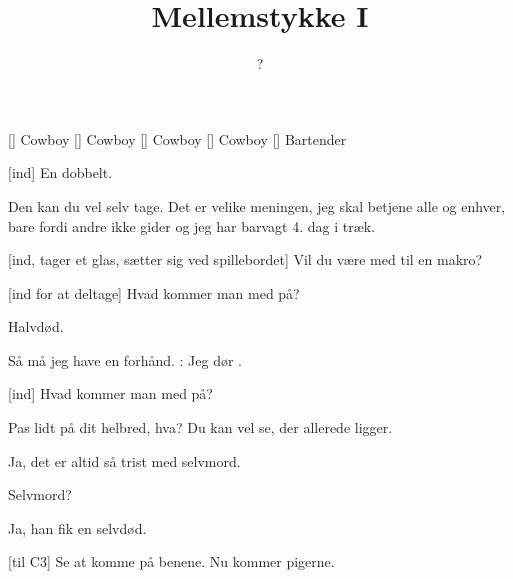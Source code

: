 \documentclass[a4paper,11pt]{article}
\title{Mellemstykke I}
\author{?}
\begin{document}
\maketitle

\begin{roles}
[] Cowboy
[] Cowboy
[] Cowboy
[] Cowboy
[] Bartender
\end{roles}

\begin{sketch}

[ind] En dobbelt.

 Den kan du vel selv tage.  Det er velike meningen, jeg skal
betjene alle og enhver, bare fordi andre ikke gider og jeg har barvagt
4. dag i træk.

[ind, tager et glas, sætter sig ved spillebordet] Vil du være
med til en makro?


[ind for at deltage] Hvad kommer man med på?

 Halvdød.

 Så må jeg have en forhånd. : Jeg dør .

[ind] Hvad kommer man med på?

 Pas lidt på dit helbred, hva?  Du kan vel se, der allerede
ligger.

 Ja, det er altid så trist med selvmord.

 Selvmord?

 Ja, han fik en selvdød.


[til C3] Se at komme på benene.  Nu kommer pigerne.


\end{sketch}
\end{document}
